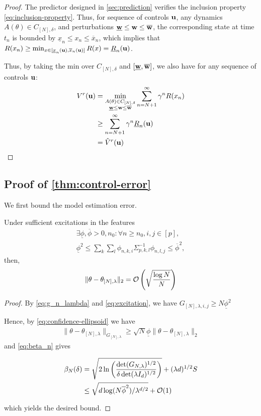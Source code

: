 \documentclass{article}
\begin{document}
\begin{proof}
	The predictor designed in \autoref{sec:prediction} verifies the inclusion property \eqref{eq:inclusion-property}. Thus, for sequence of controls $\mathbf{u}$, any dynamics $A(\theta)\in C_{[N],\delta}$, and perturbations $\underline{\mathbf{w}} \leq \mathbf{w} \leq \overline{\mathbf{w}}$, the corresponding state at time $t_n$ is bounded by $\underline{x}_n \leq x_n \leq \overline{x}_n$, which implies that $R(x_n) \geq \min_{x\in[\underline{x}_n(\mathbf{u}), \overline{x}_n(\mathbf{u})]}  R(x) = \underline{R}_n(\mathbf{u})$.
	
	Thus, by taking the min over $C_{[N],\delta}$ and $[\underline{\mathbf{w}}, \overline{\mathbf{w}}]$, we also have for any sequence of controls $\mathbf{u}$:
	\begin{align*}
	    V^r(\mathbf{u}) &= \min_{\substack{A(\theta)\in C_{[N],\delta}\\ \underline{\mathbf{w}} \leq \mathbf{w} \leq \overline{\mathbf{w}}}} \sum_{n=N+1}^\infty \gamma^n R(x_n)\\
	    &\geq \sum_{n=N+1}^\infty \gamma^n \underline{R}_n(\mathbf{u})\\
	    &= \hat{V}^r(\mathbf{u})
	\end{align*}
\end{proof}

\subsection{Proof of \autoref{thm:control-error}}

We first bound the model estimation error.
\begin{lemma}
Under sufficient excitations in the features 
\begin{align}
\label{eq:excitation}
\exists \underline{\phi},\overline{\phi}>0, n_0: \forall n\geq n_0,i,j\in[p],\nonumber\\ \underline{\phi}^2 \leq \sum_k \sum_l \phi_{n,k,i}\Sigma_{p,k,l}^{-1}\phi_{n,l,j} \leq \overline{\phi}^2,
\end{align}
then,
\[\|\theta - \theta_{[N],\lambda}\|_{2} = \mathcal{O}\left( \sqrt{\frac{\log N}{N}} \right) \]
\end{lemma}
\begin{proof}
By \eqref{eq:g_n_lambda} and \eqref{eq:excitation}, we have $G_{[N],\lambda,i,j} \geq N\underline{\phi}^2 $

Hence, by \eqref{eq:confidence-ellipsoid} we have 
\begin{align*}
	\|\theta - \theta_{[N],\lambda}\|_{G_{[N],\lambda}} \geq \sqrt{N}\underline{\phi} \|\theta - \theta_{[N],\lambda}\|_{2} 
\end{align*}
and \eqref{eq:beta_n} gives

\begin{align*}
\beta_N(\delta) &= \sqrt{2\ln \left(\frac{\det(G_{N,\lambda})^{1/2}}{\delta\det(\lambda I_d)^{1/2}}\right)}
+ (\lambda d)^{1/2}S\\
&\leq \sqrt{d\log (N\overline{\phi}^2) / \lambda^{d/2}} + \mathcal{O}(1)
\end{align*}

which yields the desired bound.
\end{proof}
\end{document}
